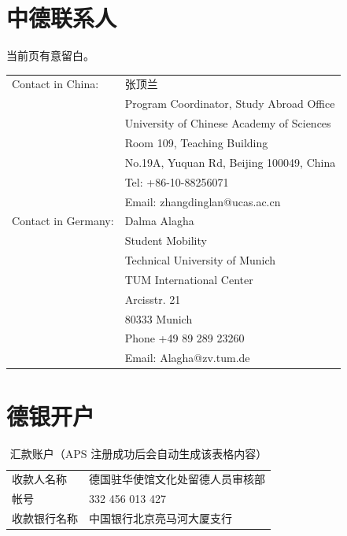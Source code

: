 \documentclass[final]{book}
\begin{document}
\begin{appendices}

\chapter{中德联系人}
当前页有意留白。
\newpage

\begin{table}[!htbp]
\centering
\label{tb:contacts}
\begin{tabular}{ll}
\toprule
Contact in China: & 张顶兰 \\
& Program Coordinator, Study Abroad Office \\
& University of Chinese Academy of Sciences \\
& Room 109, Teaching Building \\
& No.19A, Yuquan Rd, Beijing 100049, China \\
& Tel: +86-10-88256071 \\
& Email: zhangdinglan@ucas.ac.cn \\ \midrule
Contact in Germany: & Dalma Alagha \\
& Student Mobility \\
& Technical University of Munich\\
& TUM International Center \\
& Arcisstr. 21 \\
& 80333 Munich \\
& Phone +49 89 289 23260 \\
& Email: Alagha@zv.tum.de \\ \bottomrule
\end{tabular}
\end{table}

\newpage

\chapter{德银开户}\label{ap:bank}
\begin{table}[htbp]
  \caption{汇款账户（APS 注册成功后会自动生成该表格内容）}
  \label{tb:bank-account}
  \centering
  \begin{tabular}{ll}
    \toprule
    收款人名称 & 德国驻华使馆文化处留德人员审核部 \\
    帐号 & 332 456 013 427 \\
    收款银行名称 & 中国银行北京亮马河大厦支行 \\
    \bottomrule
  \end{tabular}
\end{table}


\end{appendices}
\end{document}
